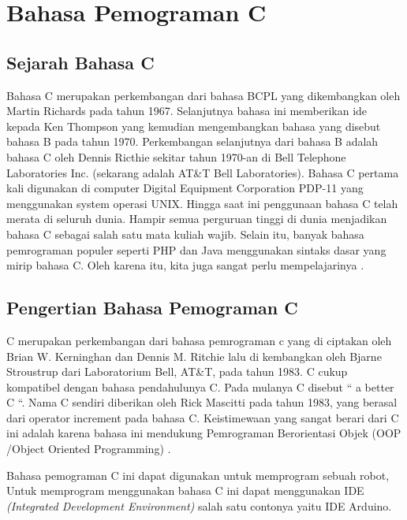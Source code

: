 \section{Bahasa Pemograman C}
\subsection{Sejarah Bahasa C}
Bahasa C merupakan perkembangan dari bahasa BCPL yang dikembangkan oleh Martin Richards pada tahun 1967. Selanjutnya bahasa ini memberikan ide kepada Ken Thompson yang kemudian mengembangkan bahasa yang disebut bahasa B pada tahun 1970. Perkembangan selanjutnya dari bahasa B adalah bahasa C oleh Dennis Ricthie sekitar tahun 1970-an di Bell Telephone Laboratories Inc. (sekarang adalah AT&T Bell Laboratories). Bahasa C pertama kali digunakan di computer Digital Equipment Corporation PDP-11 yang menggunakan system operasi UNIX. Hingga saat ini penggunaan bahasa C telah merata di seluruh dunia. Hampir semua perguruan tinggi di dunia menjadikan bahasa C sebagai salah satu mata kuliah wajib. Selain itu, banyak bahasa pemrograman populer seperti PHP dan Java menggunakan sintaks dasar yang mirip bahasa C. Oleh karena itu, kita juga sangat perlu mempelajarinya .
    
\subsection{Pengertian Bahasa Pemograman C}
C merupakan perkembangan dari bahasa pemrograman c yang di ciptakan oleh Brian W. Kerninghan dan Dennis M. Ritchie lalu di kembangkan oleh Bjarne Stroustrup dari Laboratorium Bell, AT&T, pada tahun 1983. C cukup kompatibel dengan bahasa pendahulunya C. Pada mulanya C disebut “ a better C “. Nama C sendiri diberikan oleh Rick Mascitti pada tahun 1983, yang berasal dari operator increment pada bahasa C. Keistimewaan yang sangat berari dari C ini adalah karena bahasa ini mendukung Pemrograman Berorientasi Objek (OOP /Object Oriented Programming) .

Bahasa pemograman C ini dapat digunakan untuk memprogram sebuah robot, Untuk memprogram menggunakan bahasa C ini dapat menggunakan IDE \textit{ (Integrated Development Environment)} salah satu contonya yaitu IDE Arduino. 

